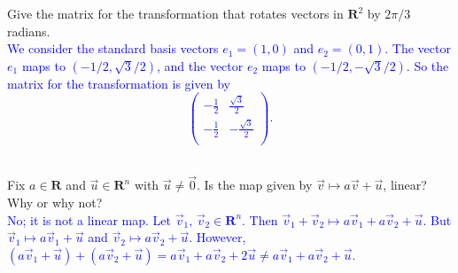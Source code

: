 \documentclass[a4paper,11pt]{article}
\newcommand{\R}{\mathbf{R}}
\newcommand{\BB}[1]{\textcolor{blue}{#1}}
\begin{document}
 Give the matrix for the transformation that
rotates vectors in $\R^2$ by $2\pi/3$ radians. \\

\BB{We consider the standard basis vectors $e_1=(1,0)$ and $e_2=(0,1)$. The
  vector $e_1$ maps to $(-1/2,\sqrt{3}/2)$, and the vector $e_2$ maps to
  $(-1/2,-\sqrt{3}/2)$. So the matrix for the transformation is given by
  \[
    \left(
      \begin{array}{cc}
        -\frac{1}{2} & \frac{\sqrt{3}}{2} \\
        -\frac{1}{2} & -\frac{\sqrt{3}}{2} \\
      \end{array}
    \right).
  \] \\
}

 Fix $a \in \R$ and $\vec u \in \R^n$ with $\vec
u \neq \vec 0$. Is the map given by $\vec v \mapsto a\vec v + \vec u$, linear?
Why or why not? \\

\BB{No; it is not a linear map. Let $\vec v_1,\,\vec v_2 \in \R^n$. Then $\vec
  v_1+\vec v_2 \mapsto a\vec v_1+a\vec v_2+\vec u$. But $\vec v_1 \mapsto a\vec
  v_1+\vec u$ and $\vec v_2 \mapsto a\vec v_2+\vec u$. However, $(a\vec v_1+\vec
  u)+(a\vec v_2+\vec u)=a\vec v_1+a\vec v_2+2\vec u \neq a\vec v_1+a\vec
  v_2+\vec u$. \\}
\end{document}
